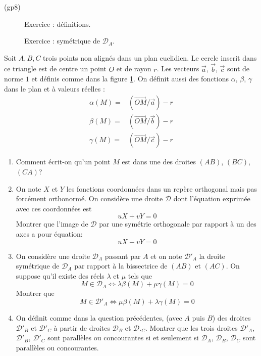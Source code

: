 \begin{tiny}(gp8)\end{tiny}
\begin{figure}[ht]
 \centering

\caption{Exercice  : définitions.}
\label{fig:Egp8_1}
\end{figure}
\begin{figure}[ht]
 \centering

\caption{Exercice : symétrique de $\mathcal D_A$.}
\label{fig:Egp8_2}
\end{figure}
Soit $A,B,C$ trois points non align{\'e}s dans un plan euclidien. Le cercle inscrit dans ce triangle est de centre un point $O$ et de rayon $r$. Les vecteurs $\overrightarrow a$, $\overrightarrow b$, $\overrightarrow c$ sont de norme $1$ et définis comme dans la figure \ref{fig:Egp8_1}. On définit aussi des fonctions $\alpha$, $\beta$, $\gamma$ dans le plan et à valeurs réelles :
\begin{align*}
 \alpha(M) =& (\overrightarrow{OM}/\overrightarrow a) -r \\
 \beta(M) =& (\overrightarrow{OM}/\overrightarrow b) -r \\
 \gamma(M) =& (\overrightarrow{OM}/\overrightarrow c) -r 
\end{align*}

\begin{enumerate}
\item Comment écrit-on qu'un point $M$ est dans une des droites $(AB)$, $(BC)$, $(CA)$?
 \item On note $X$ et $Y$ les fonctions coordonnées dans un  repère orthogonal mais pas forcément orthonormé. On considère une droite $\mathcal D$ dont l'équation exprimée avec ces coordonnées est
\begin{displaymath}
 uX + vY = 0
\end{displaymath}
Montrer que l'image de $\mathcal D$ par une symétrie orthogonale par rapport à un des axes a pour équation:
\begin{displaymath}
 uX - vY = 0
\end{displaymath}
\item On considère une droite $\mathcal D_A$ passant par $A$ et on note $\mathcal D'_A$ la droite sym{\'e}trique de $\mathcal D_A$ par rapport {\`a} la bissectrice de $(AB)$ et $(AC)$. On suppose qu'il existe des réels $\lambda$ et $\mu$ tels que
\begin{displaymath}
 M\in\mathcal D_A \Leftrightarrow \lambda \beta(M) + \mu \gamma(M) = 0
\end{displaymath}
Montrer que 
\begin{displaymath}
 M\in\mathcal D'_A \Leftrightarrow \mu \beta(M) + \lambda \gamma(M) = 0
\end{displaymath}
\item On d{\'e}finit comme dans la question précédentes, (avec $A$ puis $B$) des droites $\mathcal D'_B$ et $\mathcal D'_{C}$ à partir de droites $\mathcal D_B$ et $\mathcal D._{C}$. Montrer que les trois droites $\mathcal D'_A$, $\mathcal D'_B$, $\mathcal D'_C$ sont parall{\`e}les ou concourantes si et seulement si $\mathcal D_A$, $\mathcal D_B$, $\mathcal D_C$ sont parallèles ou concourantes.
\end{enumerate}

 